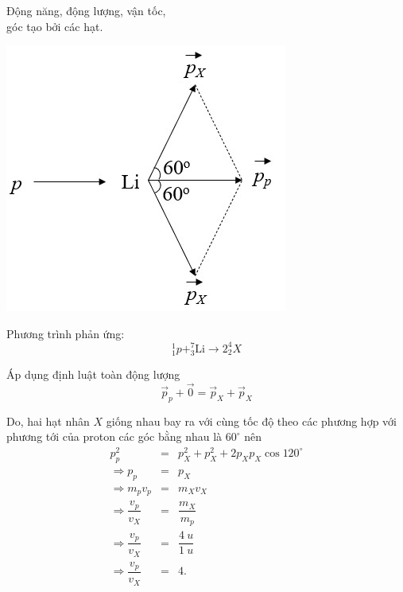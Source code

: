 \begin{dang}{Động năng, động lượng, vận tốc,\\ góc tạo bởi các hạt.}
{		\begin{center}
			\includegraphics[scale=0.8]{../figs/VN12-PH-47-L-028-2-H1.jpg}
		\end{center}
		
		Phương trình phản ứng:
		\begin{equation*}
			^1_1 p + ^7_3\text{Li} \rightarrow 2 ^4_2 X
		\end{equation*}
		
		Áp dụng định luật toàn động lượng
		\begin{equation*}
			\vec{p}_p + \vec{0} = \vec{p}_X + \vec{p}_X
		\end{equation*}
		
		Do, hai hạt nhân $X$ giống nhau bay ra với cùng tốc độ theo các phương hợp với phương tới của proton các góc bằng nhau là $60^\circ$ nên
		\begin{eqnarray*}
			p_p^2 &=& p_X^2 + p_X^2 + 2 p_X p_X \cos 120^\circ\\
			\Rightarrow p_p &=& p_X\\
			\Rightarrow m_p v_p &=& m_X v_X\\
			\Rightarrow \dfrac{v_p}{v_X} &=& \dfrac{m_X}{m_p} \\
			\Rightarrow \dfrac{v_p}{v_X} &=& \dfrac{\SI{4}{u}}{\SI{1}{u}}\\
			\Rightarrow \dfrac{v_p}{v_X} &=& 4.
		\end{eqnarray*}
		
}
\end{dang}
